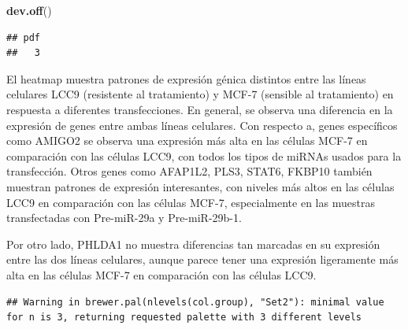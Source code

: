 \documentclass[
]{article}
\newenvironment{Shaded}{\begin{snugshade}}{\end{snugshade}}
\newcommand{\AttributeTok}[1]{\textcolor[rgb]{0.13,0.29,0.53}{#1}}
\newcommand{\CommentTok}[1]{\textcolor[rgb]{0.56,0.35,0.01}{\textit{#1}}}
\newcommand{\DocumentationTok}[1]{\textcolor[rgb]{0.56,0.35,0.01}{\textbf{\textit{#1}}}}
\newcommand{\FunctionTok}[1]{\textcolor[rgb]{0.13,0.29,0.53}{\textbf{#1}}}
\newcommand{\NormalTok}[1]{#1}
\newcommand{\OtherTok}[1]{\textcolor[rgb]{0.56,0.35,0.01}{#1}}
\newcommand{\SpecialCharTok}[1]{\textcolor[rgb]{0.81,0.36,0.00}{\textbf{#1}}}
\newcommand{\StringTok}[1]{\textcolor[rgb]{0.31,0.60,0.02}{#1}}
\begin{document}
\begin{Shaded}
\begin{Highlighting}[]
\FunctionTok{dev.off}\NormalTok{()}
\end{Highlighting}
\end{Shaded}

\begin{verbatim}
## pdf 
##   3
\end{verbatim}

El heatmap muestra patrones de expresión génica distintos entre las
líneas celulares LCC9 (resistente al tratamiento) y MCF-7 (sensible al
tratamiento) en respuesta a diferentes transfecciones. En general, se
observa una diferencia en la expresión de genes entre ambas líneas
celulares. Con respecto a, genes específicos como AMIGO2 se observa una
expresión más alta en las células MCF-7 en comparación con las células
LCC9, con todos los tipos de miRNAs usados para la transfección. Otros
genes como AFAP1L2, PLS3, STAT6, FKBP10 también muestran patrones de
expresión interesantes, con niveles más altos en las células LCC9 en
comparación con las células MCF-7, especialmente en las muestras
transfectadas con Pre-miR-29a y Pre-miR-29b-1.

Por otro lado, PHLDA1 no muestra diferencias tan marcadas en su
expresión entre las dos líneas celulares, aunque parece tener una
expresión ligeramente más alta en las células MCF-7 en comparación con
las células LCC9.

\begin{Shaded}
\end{Shaded}

\begin{verbatim}
## Warning in brewer.pal(nlevels(col.group), "Set2"): minimal value for n is 3, returning requested palette with 3 different levels
\end{verbatim}

\begin{Shaded}
\end{Shaded}
\end{document}
